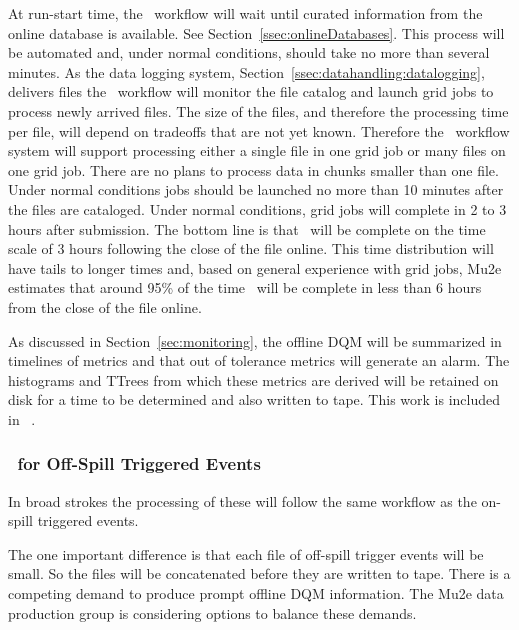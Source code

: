 At run-start time, the \passone\ workflow will wait until curated information from the online database is available.  See Section~\ref{ssec:onlineDatabases}.
This process will be automated and, under normal conditions, should take no more than several minutes.  As the data logging system, Section~\ref{ssec:datahandling:datalogging},
delivers files the \passone\ workflow will monitor the file catalog and launch grid jobs to process newly arrived files.  The size of the files, and therefore the processing time per file, 
will depend on tradeoffs that are not yet known.  
Therefore the \passone\ workflow system will support processing either a single file in one grid job or many files on one grid job.  
There are no plans to process data in chunks smaller than one file.  
Under normal conditions jobs should be launched no more than 10 minutes after the files are cataloged.
Under normal conditions, grid jobs will complete in 2 to 3 hours after submission.  
The bottom line is that \passone\ will be complete on the time scale of 3 hours following the close of the file online.
This time distribution will have tails to longer times and, based on general experience with grid jobs, Mu2e estimates that around 95\% of the time \passone\ will be complete in less than 6 hours from the close of the file online.

As discussed in Section~\ref{sec:monitoring}, the offline DQM will be summarized in timelines of metrics and that out of tolerance metrics will generate an alarm.  The histograms and TTrees from which these metrics are derived will be retained on disk for a time to be determined and also written to tape. This work is included in \passone\ .
 
\subsubsection{\passone\ for Off-Spill Triggered Events}
\label{ssec:pass1:offspilltriggered}

In broad strokes the processing of these will follow the same workflow as the on-spill triggered events.  

The one important difference is that each file of off-spill trigger events will be small.  So the files will be concatenated before they are written to tape. There is a competing demand to produce prompt offline DQM information. The Mu2e data production group is considering options to balance these demands.


